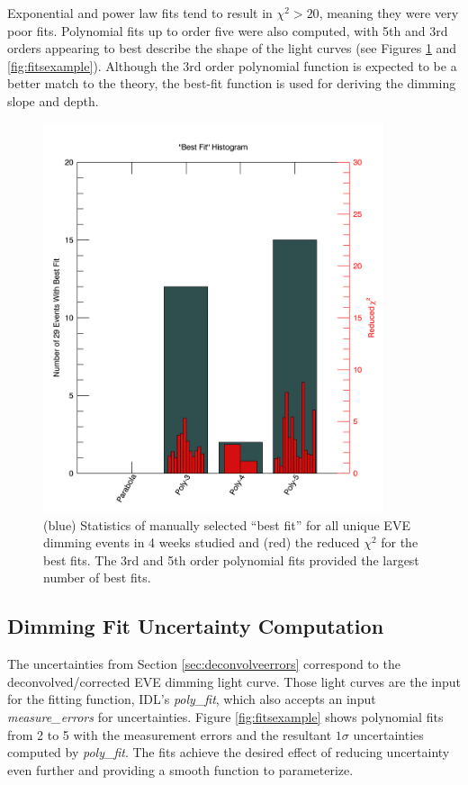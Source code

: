 Exponential and power law fits tend to result in $\chi^2 > 20$, meaning they were very poor fits. Polynomial fits up to order five were also computed, with 5th and 3rd orders appearing to best describe the shape of the light curves (see Figures \ref{fig:bestfithistogram} and \ref{fig:fitsexample}). Although the 3rd order polynomial function is expected to be a better match to the theory, the best-fit function is used for deriving the dimming slope and depth. 

\begin{figure}[!h]
    \begin{center}
	    \includegraphics[width=100mm]{Images/BestFitHistogram.png}
    \end{center}
    \caption[Dimming best fit statistics]{
        (blue) Statistics of manually selected ``best fit” for all unique EVE dimming events in 4 weeks studied and 
        (red) the reduced $\chi^2$ for the best fits. The 3rd and 5th order polynomial fits provided the largest number
        of best fits.
    }
    \label{fig:bestfithistogram}
\end{figure}

\subsection{Dimming Fit Uncertainty Computation}
The uncertainties from Section \ref{sec:deconvolveerrors} correspond to the deconvolved/corrected EVE dimming light curve. Those light curves are the input for the fitting function, IDL's \textit{poly{\_}fit}, which also accepts an input \textit{measure{\_}errors} for uncertainties. Figure \ref{fig:fitsexample} shows polynomial fits from 2 to 5 with the measurement errors and the resultant $1\sigma$ uncertainties computed by \textit{poly{\_}fit}. The fits achieve the desired effect of reducing uncertainty even further and providing a smooth function to parameterize.

